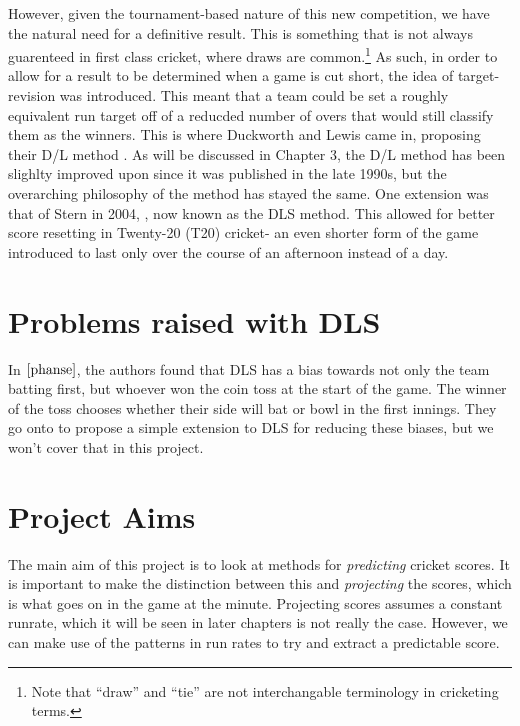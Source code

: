However, given the tournament-based nature of this new competition, we have the natural need for a definitive result.
This is something that is not always guarenteed in first class cricket, where draws are common.\footnote{Note that 
``draw'' and ``tie'' are not interchangable terminology in cricketing terms.} As such, in order to allow for a result to be
determined when a game is cut short, the idea of target-revision was introduced. This meant that a team could be set a
roughly equivalent run target off of a reducded number of overs that would still classify them as the winners.
This is where Duckworth and Lewis came in, proposing their D/L method \cite{duckworth}. As will be discussed in Chapter 3, the D/L method 
has been slighlty improved upon since it was published in the late 1990s, but the overarching philosophy of the method has stayed the same. 
One extension was that of Stern in 2004, \cite{stern}, now  known as the DLS method. This allowed for better score resetting in Twenty-20 (T20) cricket- an even shorter 
form of the game introduced to last only over the course of an afternoon instead of a day. 

\section{Problems raised with DLS}
In $\cite{phanse}$, the authors found that DLS has a bias towards not only the team batting first, but whoever won the coin toss at the start of the game.
The winner of the toss chooses whether their side will bat or bowl in the first innings. They go onto to propose a simple extension to DLS for reducing
these biases, but we won't cover that in this project. 

\section{Project Aims}
The main aim of this project is to look at methods for \textit{predicting} cricket scores. It is important to make the distinction between this 
and \textit{projecting} the scores, which is what goes on in the game at the minute. Projecting scores assumes a constant runrate, which it will be seen 
in later chapters is not really the case. However, we can make use of the patterns in run rates to try and extract a predictable score. 


